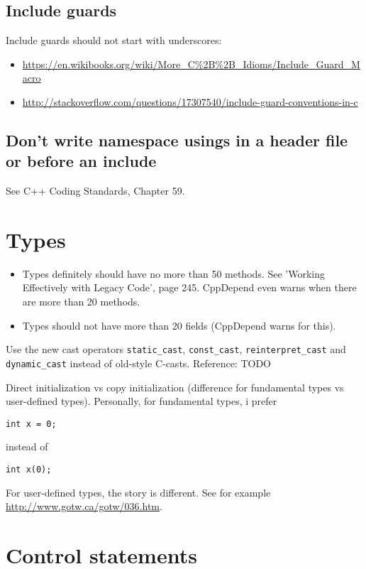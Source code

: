 \documentclass{article}
\begin{document}
\subsection{Include guards}

Include guards should not start with underscores:
\begin{itemize}
\item \url{https://en.wikibooks.org/wiki/More_C%2B%2B_Idioms/Include_Guard_Macro}
\item \url{http://stackoverflow.com/questions/17307540/include-guard-conventions-in-c}
\end{itemize}

\subsection{Don't write namespace usings in a header file or before an include}
See C++ Coding Standards, Chapter 59.

\section{Types}

\begin{itemize}
\item Types definitely should have no more than 50 methods.
See 'Working Effectively with Legacy Code', page 245.
CppDepend even warns when there are more than 20 methods.
\item Types should not have more than 20 fields (CppDepend warns for this).
\end{itemize}

Use the new cast operators \lstinline{static_cast}, \lstinline{const_cast}, \lstinline{reinterpret_cast} and \lstinline{dynamic_cast} instead of old-style C-casts.
Reference: TODO

Direct initialization vs copy initialization (difference for fundamental types vs user-defined types).  Personally, for fundamental types, i prefer
\begin{lstlisting}
int x = 0;
\end{lstlisting}
instead of
\begin{lstlisting}
int x(0);
\end{lstlisting}
For user-defined types, the story is different.  See for example \url{http://www.gotw.ca/gotw/036.htm}.

\section{Control statements}
\end{document}
